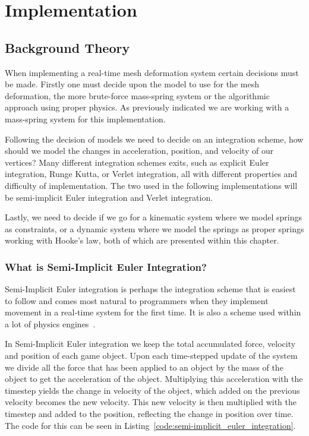 \chapter{Implementation}
\section{Background Theory}
\label{chap:implementation}
When implementing a real-time mesh deformation system certain decisions must be made.
Firstly one must decide upon the model to use for the mesh deformation, the more brute-force mass-spring system or the algorithmic approach using proper physics.
As previously indicated we are working with a mass-spring system for this implementation.

Following the decision of models we need to decide on an integration scheme, how should we model the changes in acceleration, position, and velocity of our vertices?
Many different integration schemes exits, such as explicit Euler integration, Runge Kutta, or Verlet integration, all with different properties and difficulty of implementation.
The two used in the following implementations will be semi-implicit Euler integration and Verlet integration.

Lastly, we need to decide if we go for a kinematic system where we model springs as constraints, 
or a dynamic system where we model the springs as proper springs working with Hooke's law\cite{math_for_games}, both of which are presented within this chapter.

\subsection{What is Semi-Implicit Euler Integration?}
Semi-Implicit Euler integration is perhaps the integration scheme that is easiest to follow and comes most natural to programmers when they implement
movement in a real-time system for the first time. It is also a scheme used within a lot of physics engines~\cite{gafferongames_integration}.

In Semi-Implicit Euler integration we keep the total accumulated force, velocity and position of each game object.
Upon each time-stepped update of the system we divide all the force that has been applied to an object by the mass of the object to get the acceleration of the object.
Multiplying this acceleration with the timestep yields the change in velocity of the object, which added on the previous velocity becomes the new velocity.
This new velocity is then multiplied with the timestep and added to the position, reflecting the change in position over time.
The code for this can be seen in Listing~\ref{code:semi-implicit_euler_integration}.

